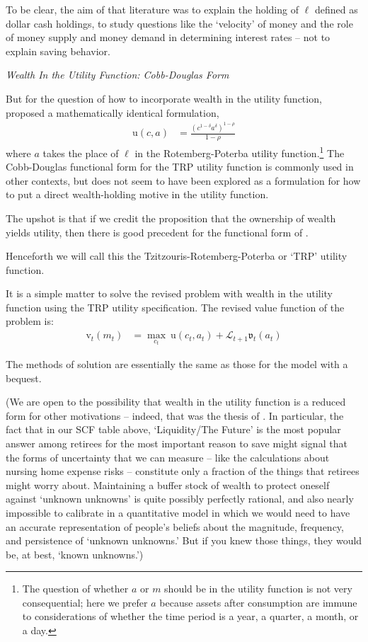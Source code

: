 \documentclass{article}
\newcommand{\CRRA}{\rho}
\newcommand{\uFunc}{\mathrm{u}}
\newcommand{\vFunc}{\mathrm{v}}
\newcommand{\Alive}{\mathcal{L}}
\newcommand{\cNrm}{c}
\newcommand{\aNrm}{a}
\newcommand{\mNrm}{m}
\newcommand{\lqdt}{\ell}
\begin{document}
To be clear, the aim of that literature was to explain the holding of $\lqdt$ defined as dollar cash holdings, to study questions like the `velocity' of money and the role of money supply and money demand in determining interest rates -- not to explain saving behavior.

\textit{Wealth In the Utility Function: Cobb-Douglas Form}

But for the question of how to incorporate wealth in the utility function, \cite{Tzitzouris_2024} proposed a mathematically identical formulation,
\begin{align}
    \uFunc(\cNrm,\aNrm) & = \frac{\left(
        \cNrm^{1-\delta}\aNrm^{\delta}
        \right)^{1-\CRRA}}{1-\CRRA}
\end{align}
where $\aNrm$ takes the place of $\lqdt$ in the Rotemberg-Poterba utility function.\footnote{The question of whether $\aNrm$ or $\mNrm$ should be in the utility function is not very consequential; here we prefer $\aNrm$ because assets after consumption are immune to considerations of whether the time period is a year, a quarter, a month, or a day.} The Cobb-Douglas functional form for the TRP utility function is commonly used in other contexts, but does not seem to have been explored as a formulation for how to put a direct wealth-holding motive in the utility function.

The upshot is that if we credit the proposition that the ownership of wealth yields utility, then there is good precedent for the functional form of \cite{Tzitzouris_2024}.


Henceforth we will call this the Tzitzouris-Rotemberg-Poterba or `TRP' utility function.

It is a simple matter to solve the revised problem with wealth in the utility function using the TRP utility specification. The revised value function of the problem is:
\begin{align}
    {\vFunc}_{t}({\mNrm}_{t}) & = \max_{\cNrm_{t}} ~ \uFunc(\cNrm_{t}, \aNrm_{t})+\Alive_{t+1}\mathfrak{v}_{t}(a_{t})
\end{align}

The methods of solution are essentially the same as those for the model with a bequest.

(We are open to the possibility that wealth in the utility function is a reduced form for other motivations -- indeed, that was the thesis of \cite{WhyDoTheRich}.  In particular, the fact that in our SCF table above, `Liquidity/The Future' is the most popular answer among retirees for the most important reason to save might signal that the forms of uncertainty that we can measure -- like the \cite{Ameriks2020jpe} calculations about nursing home expense risks -- constitute only a fraction of the things that retirees might worry about.  Maintaining a buffer stock of wealth to protect oneself against `unknown unknowns' is quite possibly perfectly rational, and also nearly impossible to calibrate in a quantitative model in which we would need to have an accurate representation of people's beliefs about the magnitude, frequency, and persistence of `unknown unknowns.'  But if you knew those things, they would be, at best, `known unknowns.')
\end{document}

